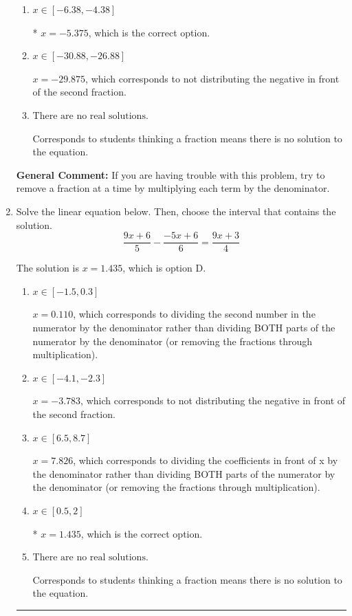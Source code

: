 \documentclass{extbook}[14pt]
\newcommand{\litem}[1]{\item #1

\rule{\textwidth}{0.4pt}}
\begin{document}
\begin{enumerate}
{\begin{enumerate}[label=\Alph*.]
 $x = -0.171$, which corresponds to dividing the second number in the numerator by the denominator rather than dividing BOTH parts of the numerator by the denominator (or removing the fractions through multiplication).
\item \( x \in [-6.38, -4.38] \)

* $x = -5.375$, which is the correct option.
\item \( x \in [-30.88, -26.88] \)

 $x = -29.875$, which corresponds to not distributing the negative in front of the second fraction.
\item \( \text{There are no real solutions.} \)

Corresponds to students thinking a fraction means there is no solution to the equation.
\end{enumerate}

\textbf{General Comment:} If you are having trouble with this problem, try to remove a fraction at a time by multiplying each term by the denominator.
}
\litem{
Solve the linear equation below. Then, choose the interval that contains the solution.
\[ \frac{9x + 6}{5} - \frac{-5x + 6}{6} = \frac{9x + 3}{4} \]

The solution is \( x = 1.435 \), which is option D.\begin{enumerate}[label=\Alph*.]
\item \( x \in [-1.5, 0.3] \)

 $x = 0.110$, which corresponds to dividing the second number in the numerator by the denominator rather than dividing BOTH parts of the numerator by the denominator (or removing the fractions through multiplication).
\item \( x \in [-4.1, -2.3] \)

 $x = -3.783$, which corresponds to not distributing the negative in front of the second fraction.
\item \( x \in [6.5, 8.7] \)

 $x = 7.826$, which corresponds to dividing the coefficients in front of x by the denominator rather than dividing BOTH parts of the numerator by the denominator (or removing the fractions through multiplication).
\item \( x \in [0.5, 2] \)

* $x = 1.435$, which is the correct option.
\item \( \text{There are no real solutions.} \)

Corresponds to students thinking a fraction means there is no solution to the equation.
\end{enumerate}

}
\end{enumerate}
\end{document}
